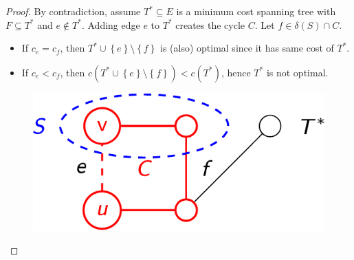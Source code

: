 \begin{enumerate}
    \begin{proof}
        By contradiction, assume $T^{*} \subseteq E$ is a minimum cost spanning tree with $F \subseteq T^{*}$ and $e \notin T^{*}$. Adding edge $e$ to $T^{*}$ creates the cycle $C$. Let $f \in \delta\left(S\right) \cap C$.
        \begin{itemize}
            \item If $c_{e} = c_{f}$, then $T^{*} \cup \left\{e\right\} \setminus \left\{f\right\}$ is (also) optimal since it has same cost of $T^{*}$.
            
            \item If $c_{e} < c_{f}$, then $c\left(T^{*} \cup \left\{e\right\} \setminus \left\{f\right\}\right) < c\left(T^{*}\right)$, hence $T^{*}$ is not optimal.
        \end{itemize}
        \begin{figure}[!htp]
            \centering
            \includegraphics[width=.4\textwidth]{img/trees-9.pdf}
        \end{figure}
    \end{proof}
\end{enumerate}